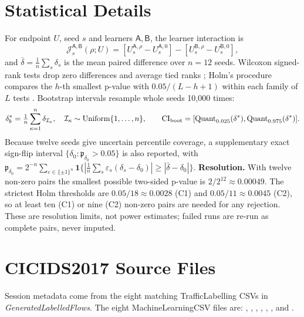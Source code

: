 \documentclass[10pt,a4paper]{article}
\begin{document}
\section{Statistical Details}
\label{app:stats}
For endpoint $U$, seed $s$ and learners $\mathsf A,\mathsf B$, the learner interaction is
\begin{equation}
\mathcal J_s^{\mathsf A,\mathsf B}(\rho;U)=[U_s^{\mathsf A,\rho}-U_s^{\mathsf A,0}]-[U_s^{\mathsf B,\rho}-U_s^{\mathsf B,0}],
\label{eq:interaction}
\end{equation}
and $\bar\delta=\frac1n\sum_s\delta_s$ is the mean paired difference over $n=12$ seeds. Wilcoxon signed-rank tests drop zero differences and average tied ranks \cite{wilcoxon}; Holm's procedure compares the $h$-th smallest p-value with $0.05/(L-h+1)$ within each family of $L$ tests \cite{holm}. Bootstrap intervals resample whole seeds 10,000 times:
\begin{equation}
\delta_b^*=\tfrac1n\sum_{\kappa=1}^n\delta_{\mathcal I_\kappa},\quad\mathcal I_\kappa\sim\operatorname{Uniform}\{1,\ldots,n\},\qquad
\mathrm{CI}_{\rm boot}=[\operatorname{Quant}_{0.025}(\delta^*),\operatorname{Quant}_{0.975}(\delta^*)].
\label{eq:bootstrap}
\end{equation}
Because twelve seeds give uncertain percentile coverage, a supplementary exact sign-flip interval $\{\delta_0:\mathfrak p_{\delta_0}>0.05\}$ is also reported, with
$\mathfrak p_{\delta_0}=2^{-n}\sum_{\varepsilon\in\{\pm1\}^n}\mathbf 1\{|\frac1n\sum_s\varepsilon_s(\delta_s-\delta_0)|\ge|\bar\delta-\delta_0|\}$.
\textbf{Resolution.} With twelve non-zero pairs the smallest possible two-sided p-value is $2/2^{12}\approx0.00049$. The strictest Holm thresholds are $0.05/18\approx0.0028$ (C1) and $0.05/11\approx0.0045$ (C2), so at least ten (C1) or nine (C2) non-zero pairs are needed for any rejection. These are resolution limits, not power estimates; failed runs are re-run as complete pairs, never imputed.

\section{CICIDS2017 Source Files}
\label{app:files}
Session metadata come from the eight matching TrafficLabelling CSVs in \emph{GeneratedLabelledFlows}. The eight MachineLearningCSV files are: , , , , , ,  and .
\end{document}
